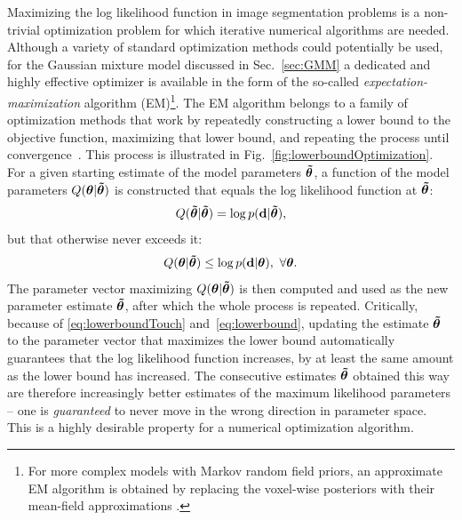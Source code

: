\documentclass[10pt,twoside]{book}
\begin{document}
Maximizing the log likelihood function in image segmentation problems is a non-trivial optimization problem for which iterative 
numerical algorithms are needed. Although a variety of standard optimization methods could potentially be used, for the Gaussian mixture
model discussed in Sec.~\ref{sec:GMM} a dedicated and highly effective optimizer is available in the form of the so-called 
\emph{expectation-maximization} algorithm (EM)\footnote{For more complex models with Markov random field priors, an approximate 
EM algorithm is obtained by replacing the voxel-wise posteriors 
with their mean-field approximations%
.}. The EM algorithm belongs to a family of optimization methods that work by repeatedly constructing
a lower bound to the objective function, maximizing that lower bound, and repeating the process until convergence~\cite{HunterAS2004}. 
This process is illustrated in Fig.~\ref{fig:lowerboundOptimization}. For a given starting estimate of the model parameters ${\mbox{\boldmath {${ \tilde{\theta} }$}}}$,
a function of the model parameters $Q( {\mbox{\boldmath {${\theta}$}}} | {\mbox{\boldmath {${ \tilde{\theta} }$}}} )$ is constructed that equals the log likelihood 
function at ${\mbox{\boldmath {${ \tilde{\theta} }$}}}$:
\begin{equation}
Q( {\mbox{\boldmath {${\tilde{\theta}}$}}} | {\mbox{\boldmath {${ \tilde{\theta} }$}}} ) = \log p( \mathbf{d} | {\mbox{\boldmath {${ \tilde{\theta} }$}}} ),
\label{eq:lowerboundTouch}
\end{equation}
but that otherwise never exceeds it:
\begin{equation}
Q( {\mbox{\boldmath {${\theta}$}}} | {\mbox{\boldmath {${ \tilde{\theta} }$}}} ) \leq \log p( \mathbf{d} | {\mbox{\boldmath {${ \theta}$}}} ),  \,\, \forall {\mbox{\boldmath {${\theta}$}}}.
\label{eq:lowerbound}
\end{equation}
The parameter vector maximizing $Q( {\mbox{\boldmath {${\theta}$}}} | {\mbox{\boldmath {${ \tilde{\theta} }$}}} )$ is then computed and used as the new parameter
estimate ${\mbox{\boldmath {${\tilde{\theta}}$}}}$, after which the whole process is repeated. Critically, because of \eqref{eq:lowerboundTouch} 
and~\eqref{eq:lowerbound}, updating the estimate ${\mbox{\boldmath {${\tilde{\theta}}$}}}$ to the parameter vector that maximizes the lower bound 
automatically guarantees that the log likelihood function increases, by at least the same amount as the lower 
bound has increased. The consecutive estimates ${\mbox{\boldmath {${\tilde{\theta}}$}}}$ obtained this way are therefore increasingly better estimates
of the maximum likelihood parameters -- one is \emph{guaranteed} to never move in the wrong direction in parameter space. This is a 
highly desirable property for a numerical optimization algorithm.
\end{document}
